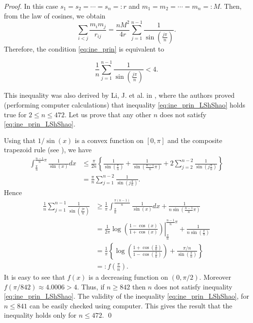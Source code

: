 \documentclass[smallcondensed]{svjour3}
\begin{document}
\begin{proof}
In this case $s_1=s_2=\cdots=s_n=:r$ and $m_1=m_2=\cdots=m_n=:M$. Then, from the law of cosines, we obtain
\[
 \sum_{i<j}\frac{m_im_j}{r_{ij}}=\frac{nM^2}{4r}\sum_{j=1}^{n-1}\frac{1}{\sin\left(\frac{j\pi}{n}\right)}.
\]
Therefore, the condition \eqref{eq:ine_prin} is equivalent to

\begin{equation}\label{eq:ine_prin_LShShao}
  \frac1n\sum_{j=1}^{n-1}\frac{1}{\sin\left(\frac{j\pi}{n}\right)}<4.
\end{equation}

This inequality was also derived by Li, J. et al. in \cite{li2013characterization}, where the authors proved (performing computer calculations) that inequality \eqref{eq:ine_prin_LShShao} holds true for $2\leq n\leq 472$. Let us prove that any other $n$ does not satisfy \eqref{eq:ine_prin_LShShao}.


Using that $1/\sin (x)$ is a convex function on $[0,\pi]$ and the composite trapezoid rule (see \cite{kincaid1991numerical}), we have 
\[
\begin{split}
 \int_{\frac{\pi}{n}}^{\frac{n-1}{n}\pi}\frac{1}{\sin (x)}dx&\leq \frac{\pi}{2n}\left\{ \frac{1}{\sin(\frac{\pi}{n})} + \frac{1}{\sin(\frac{n-1}{n}\pi)} +2\sum_{j=2}^{n-2}\frac{1}{\sin(j\frac{\pi}{n})} \right\}\\
 &=\frac{\pi}{n}\sum_{j=1}^{n-2}\frac{1}{\sin(j\frac{\pi}{n})}.
\end{split}
\]
Hence
\[
\begin{split}
 \frac1n \sum_{j=1}^{n-1}\frac{1}{\sin\left(\frac{j\pi}{n}\right)}&\geq \frac{1}{\pi}\int_{\frac{\pi}{n}}^{\frac{\pi(n-1)}{n}}\frac{1}{\sin (x)}dx+\frac{1}{n\sin\left(\frac{n-1}{n}\pi\right)}\\
 &=\left.\frac{1}{2\pi}\log \left( \frac{1-\cos(x)}{1+\cos(x)}\right)\right|_{\frac{\pi}{n}}^{\frac{n-1}{n}\pi}+\frac{1}{n\sin\left(\frac{\pi}{n}\right)}\\
 &=\frac{1}{\pi}\left\{\log \left(\frac{1+\cos(\frac{\pi}{n})}{1-\cos(\frac{\pi}{n})}\right)+\frac{\pi/n}{\sin\left(\frac{\pi}{n}\right)}\right\}\\
 &=:f\left(\frac{\pi}{n} \right).
 \end{split}
\]
It is easy to see that $f(x)$ is a decreasing function on $(0,\pi/2)$. Moreover $f(\pi/842)\approx 4.0006>4$. Thus, if $n\geq 842$ then $n$ does not satisfy inequality \eqref{eq:ine_prin_LShShao}. The validity of the inequality \eqref{eq:ine_prin_LShShao}, for $n\leq 841$ can be easily checked using computer. This gives the result that the inequality holds only for $n \leq 472$.
\qed\end{proof}
\end{document}

